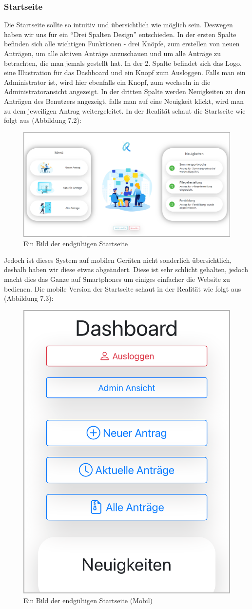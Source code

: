 \subsubsection{Startseite}
Die Startseite sollte so intuitiv und übersichtlich wie möglich sein. Deswegen haben wir uns für ein \enquote{Drei Spalten Design} entschieden. In der ersten Spalte befinden sich alle wichtigen Funktionen - drei Knöpfe, zum erstellen von neuen Anträgen, um alle aktiven Anträge anzuschauen und um alle Anträge zu betrachten, die man jemals gestellt hat. In der 2. Spalte befindet sich das Logo, eine Illustration für das Dashboard und ein Knopf zum Ausloggen. Falls man ein Administrator ist, wird hier ebenfalls ein Knopf, zum wechseln in die Administratoransicht angezeigt. In der dritten Spalte werden Neuigkeiten zu den Anträgen des Benutzers angezeigt, falls man auf eine Neuigkeit klickt, wird man zu dem jeweiligen Antrag weitergeleitet. In der Realität schaut die Startseite wie folgt aus (Abbildung 7.2):
\begin{figure}[H]
	\centering
	\includegraphics[width=1\linewidth]{images/website/dashboard}
	\caption[Dashboard]{Ein Bild der endgültigen Startseite}
	\label{fig:dashboard}
\end{figure}
Jedoch ist dieses System auf mobilen Geräten nicht sonderlich übersichtlich, deshalb haben wir diese etwas abgeändert. Diese ist sehr schlicht gehalten, jedoch macht dies das Ganze auf Smartphones um einiges einfacher die Website zu bedienen. Die mobile Version der Startseite schaut in der Realität wie folgt aus (Abbildung 7.3):
\begin{figure}[H]
	\centering
	\includegraphics[width=0.4\linewidth]{images/website/dashboard_mobile}
	\caption[Dashboard Mobil]{Ein Bild der endgültigen Startseite (Mobil)}
	\label{fig:dashboardmobile}
\end{figure}


